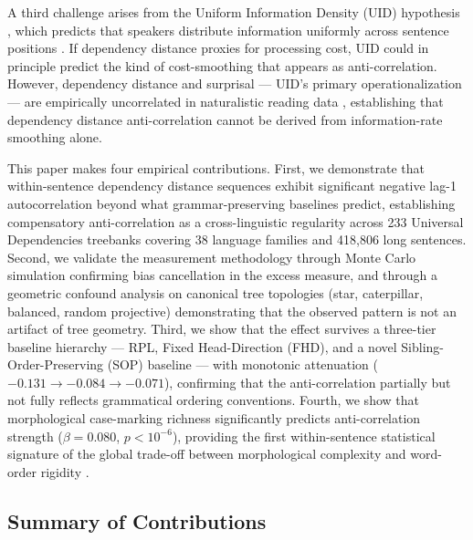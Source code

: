 \documentclass[11pt,letterpaper]{article}
\begin{document}
A third challenge arises from the Uniform Information Density (UID) hypothesis \citep{Jaeger2010}, which predicts that speakers distribute information uniformly across sentence positions \citep{Clark2023}. If dependency distance proxies for processing cost, UID could in principle predict the kind of cost-smoothing that appears as anti-correlation. However, dependency distance and surprisal --- UID's primary operationalization --- are empirically uncorrelated in naturalistic reading data \citep{Demberg2008}, establishing that dependency distance anti-correlation cannot be derived from information-rate smoothing alone.

This paper makes four empirical contributions. First, we demonstrate that within-sentence dependency distance sequences exhibit significant negative lag-1 autocorrelation beyond what grammar-preserving baselines predict, establishing compensatory anti-correlation as a cross-linguistic regularity across 233 Universal Dependencies treebanks covering 38 language families and 418,806 long sentences. Second, we validate the measurement methodology through Monte Carlo simulation confirming bias cancellation in the excess measure, and through a geometric confound analysis on canonical tree topologies (star, caterpillar, balanced, random projective) demonstrating that the observed pattern is not an artifact of tree geometry. Third, we show that the effect survives a three-tier baseline hierarchy --- RPL, Fixed Head-Direction (FHD), and a novel Sibling-Order-Preserving (SOP) baseline --- with monotonic attenuation ($-0.131 \to -0.084 \to -0.071$), confirming that the anti-correlation partially but not fully reflects grammatical ordering conventions. Fourth, we show that morphological case-marking richness significantly predicts anti-correlation strength ($\beta = 0.080$, $p < 10^{-6}$), providing the first within-sentence statistical signature of the global trade-off between morphological complexity and word-order rigidity \citep{Bentz2017}.

\subsection{Summary of Contributions}
\end{document}
